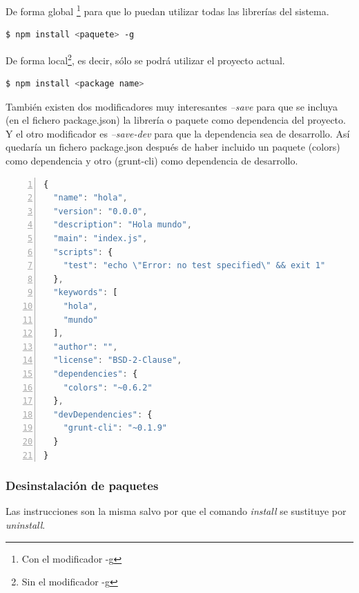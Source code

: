 De forma global \footnote{Con el modificador -g} para que lo puedan utilizar todas las librerías del sistema.

\begin{lstlisting}[language=bash, numbers=none]
$ npm install <paquete> -g
\end{lstlisting}

De forma local\footnote{Sin el modificador -g}, es decir, sólo se podrá utilizar el proyecto actual.

\begin{lstlisting}[language=bash, numbers=none]
$ npm install <package name>
\end{lstlisting}

También existen dos modificadores muy interesantes \textit{--save} para que se incluya (en el fichero package.json) la librería o paquete como dependencia del proyecto. Y el otro modificador es \textit{--save-dev} para que la dependencia sea de desarrollo. Así quedaría un fichero package.json después de haber incluido un paquete (colors) como dependencia y otro (grunt-cli) como dependencia de desarrollo.

\begin{lstlisting}[language=JavaScript, numbers=left]
{
  "name": "hola",
  "version": "0.0.0",
  "description": "Hola mundo",
  "main": "index.js",
  "scripts": {
    "test": "echo \"Error: no test specified\" && exit 1"
  },
  "keywords": [
    "hola",
    "mundo"
  ],
  "author": "",
  "license": "BSD-2-Clause",
  "dependencies": {
    "colors": "~0.6.2"
  },
  "devDependencies": {
    "grunt-cli": "~0.1.9"
  }
}
\end{lstlisting}

\subsubsection{Desinstalación de paquetes}

Las instrucciones son la misma salvo por que el comando \textit{install} se sustituye por \textit{uninstall}.

